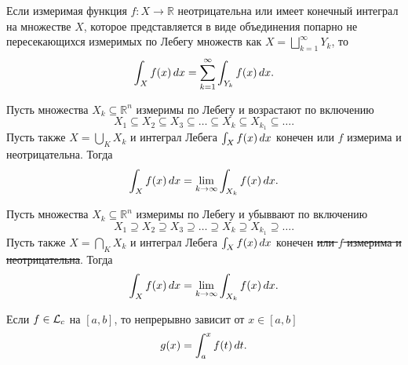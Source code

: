 
\begin{to_thr}
\label{5.78}
    Если измеримая функция $f \colon X \to \mathbb{R}$ неотрицательна или имеет конечный интеграл на множестве $X$, которое представляется в виде объединения попарно не пересекающихся измеримых по Лебегу множеств как $X = \bigsqcup_{k=1}^{\infty} Y_k$, то
    $$
        \int_X f(x) \, d x = \sum_{k=1}^{\infty} \int_{Y_k} f(x) \, d x.
    $$
\end{to_thr}

\begin{to_thr}
\label{cont_L}
    Пусть множества $X_k \subseteq \mathbb{R}^n$ измеримы по Лебегу и возрастают по включению
    $$
    X_1 \subseteq X_2 \subseteq X_3 \subseteq \dots \subseteq X_k \subseteq X_{k_1} \subseteq \dots.
    $$
    Пусть также $X = \bigcup_K X_k$ и интеграл Лебега $\int_X f(x) \, d x$ конечен или $f$ измерима и неотрицательна. Тогда
    $$
    \int_X f(x) \, d x = \lim_{k \to \infty} \int_{X_k} f(x)\, d x.
    $$
\end{to_thr}

\begin{to_thr}
\label{5.81}
    Пусть множества $X_k \subseteq \mathbb{R}^n$ измеримы по Лебегу и убыввают по включению
    $$
    X_1 \supseteq X_2 \supseteq X_3 \supseteq \dots \supseteq X_k \supseteq X_{k_1} \supseteq \dots.
    $$
    Пусть также $X = \bigcap_K X_k$ и интеграл Лебега $\int_X f(x) \, d x$ конечен \sout{или $f$ измерима и неотрицательна}. Тогда
    $$
    \int_X f(x) \, d x = \lim_{k \to \infty} \int_{X_k} f(x)\, d x.
    $$
\end{to_thr}

\begin{to_thr}
\label{5.82}
    Если $f \in \mathcal{L}_c$ на $[a, b]$, то непрерывно зависит от $x \in [a, b]$
    $$
    g(x) = \int_a^x f(t) \, d t.
    $$
\end{to_thr}

